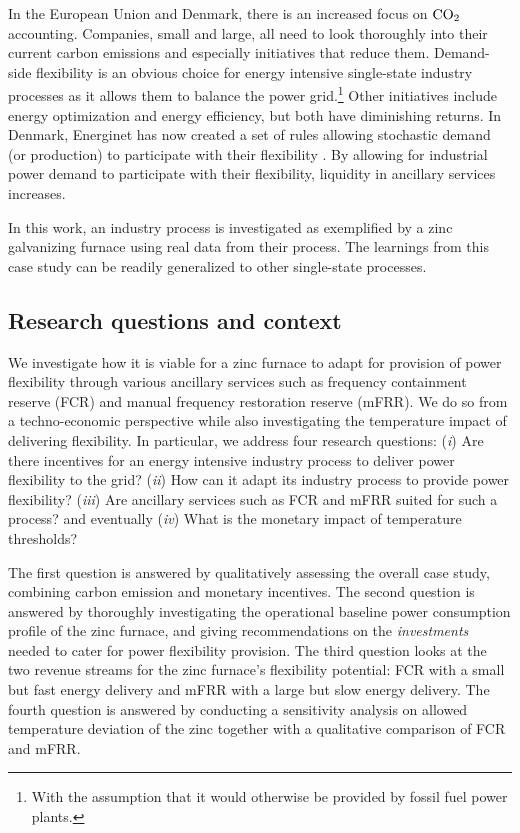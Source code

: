 \documentclass[conference]{IEEEtran}
\begin{document}
In the European Union and Denmark, there is an increased focus on $\rm{CO_{2}}$ accounting. Companies, small and large, all need to look thoroughly into their current carbon emissions and especially initiatives that reduce them. Demand-side flexibility is an obvious choice for energy intensive single-state industry processes as it allows them to balance the power grid.\footnote{With the assumption that it would otherwise be provided by fossil fuel power plants.} Other initiatives include energy optimization and energy efficiency, but both have diminishing returns. In Denmark, Energinet has now created a set of rules allowing stochastic demand (or production) to participate with their flexibility \cite{energinet:prequalification}. By allowing for industrial power demand to participate with their flexibility, liquidity in ancillary services increases.

In this work, an industry process is investigated as exemplified by a zinc galvanizing furnace using real data from their process. The learnings from this case study can be readily generalized to other single-state processes.


\subsection{Research questions and context}

We investigate how it is viable for a zinc furnace to adapt for provision of power flexibility through various ancillary services such as frequency containment reserve (FCR) and manual frequency restoration reserve (mFRR). We do so from a techno-economic perspective while also investigating the temperature impact of delivering flexibility. In particular, we address four research questions: (\textit{i}) Are there incentives for an energy intensive industry process to deliver power flexibility to the grid? (\textit{ii}) How can it adapt its industry process to provide power flexibility? (\textit{iii}) Are ancillary services such as FCR and mFRR suited for such a process? and eventually (\textit{iv})  What is the monetary impact of temperature thresholds?

The first question is answered by qualitatively assessing the overall case study, combining carbon emission and monetary incentives. The second question is answered by thoroughly investigating the operational baseline power consumption profile of the zinc furnace, and giving recommendations on the \textit{investments} needed to cater for power flexibility provision. The third question looks at the two revenue streams for the zinc furnace's flexibility potential: FCR with a small but fast energy delivery and mFRR with a large but slow energy delivery. The fourth question is answered by conducting a sensitivity analysis on allowed temperature deviation of the zinc together with a qualitative comparison of FCR and mFRR.
\end{document}
